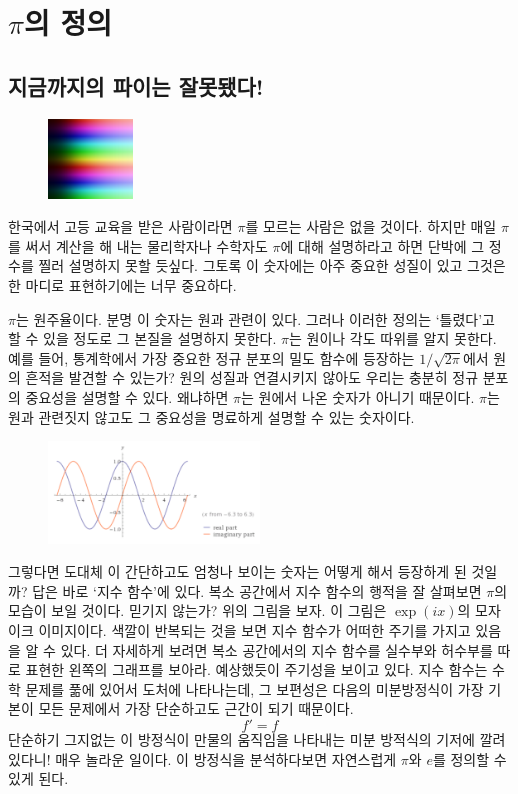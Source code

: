 \documentclass[10pt]{article}
\begin{document}
\section{$\pi$의 정의}
\subsection{지금까지의 파이는 잘못됐다!}
\begin{figure}
  \centering
  \includegraphics[width = 0.2\textwidth]{exp_mosaic.png}
\end{figure}\par
한국에서 고등 교육을 받은 사람이라면 $\pi$를 모르는 사람은 없을 것이다. 하지만 매일 $\pi$를 써서 계산을 해 내는 물리학자나 수학자도 $\pi$에 대해 설명하라고 하면 단박에 그 정수를 찔러 설명하지 못할 듯싶다. 그토록 이 숫자에는 아주 중요한 성질이 있고 그것은 한 마디로 표현하기에는 너무 중요하다.\par
$\pi$는 원주율이다. 분명 이 숫자는 원과 관련이 있다. 그러나 이러한 정의는 `틀렸다'고 할 수 있을 정도로 그 본질을 설명하지 못한다. $\pi$는 원이나 각도 따위를 알지 못한다. 예를 들어, 통계학에서 가장 중요한 정규 분포의 밀도 함수에 등장하는 $1/\sqrt{2\pi}$에서 원의 흔적을 발견할 수 있는가? 원의 성질과 연결시키지 않아도 우리는 충분히 정규 분포의 중요성을 설명할 수 있다. 왜냐하면 $\pi$는 원에서 나온 숫자가 아니기 때문이다. $\pi$는 원과 관련짓지 않고도 그 중요성을 명료하게 설명할 수 있는 숫자이다.\par
\begin{figure}
  \centering
  \includegraphics[width = 0.5\textwidth]{exponential.png}
\end{figure}
그렇다면 도대체 이 간단하고도 엄청나 보이는 숫자는 어떻게 해서 등장하게 된 것일까? 답은 바로 `지수 함수'에 있다. 복소 공간에서 지수 함수의 행적을 잘 살펴보면 $\pi$의 모습이 보일 것이다. 믿기지 않는가? 위의 그림을 보자. 이 그림은 $\exp\left(ix\right)$의 모자이크 이미지이다.
색깔이 반복되는 것을 보면 지수 함수가 어떠한 주기를 가지고 있음을 알 수 있다. 더 자세하게 보려면 복소 공간에서의 지수 함수를 실수부와 허수부를 따로 표현한 왼쪽의 그래프를 보아라. 예상했듯이 주기성을 보이고 있다. 지수 함수는 수학 문제를 풂에 있어서 도처에 나타나는데, 그 보편성은 다음의 미분방정식이 가장 기본이 모든 문제에서 가장 단순하고도 근간이 되기 때문이다.
$$
  f' = f
$$
단순하기 그지없는 이 방정식이 만물의 움직임을 나타내는 미분 방적식의 기저에 깔려 있다니! 매우 놀라운 일이다. 이 방정식을 분석하다보면 자연스럽게 $\pi$와 $e$를 정의할 수 있게 된다. 
\end{document}
